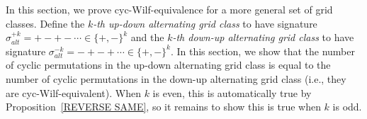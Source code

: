 \documentclass[12pt]{article}
\theoremstyle{plain}
\theoremstyle{definition}
\begin{document}
In this section, we prove cyc-Wilf-equivalence for a more general set of grid classes.
Define the \textit{$k$-th up-down alternating grid class} to have signature $\sigma_{alt}^{+k}=+-+-\cdots \in \{+,-\}^k$ and the \textit{$k$-th down-up alternating grid class} to have signature $\sigma_{alt}^{-k}=-+-+\cdots\in\{+,-\}^k$. %
In this section, we show that the number of cyclic permutations in the up-down alternating grid class is equal to the number of cyclic permutations in the down-up alternating grid class (i.e., they are cyc-Wilf-equivalent). When $k$ is even, this is automatically true by Proposition~\ref{REVERSE SAME}, so it remains to show this is true when $k$ is odd.
\end{document}

